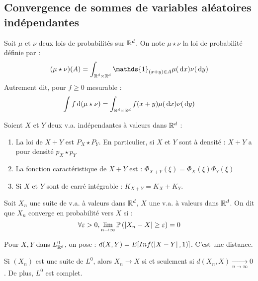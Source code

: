 \documentclass{cours}
\begin{document}
\subsection{Convergence de sommes de variables aléatoires indépendantes}

\begin{definition}
    Soit $\mu$ et $\nu$ deux lois de probabilités sur $\mathbb{R}^{d}$. On note $\mu \star \nu$ la loi de probabilité définie par :
    \[
        (\mu \star \nu)(A) = \int_{\R^{d} \times \R^{d}} \mathds{1}_{(x + y) \in A} \mu(\d x) \nu(\d y)
    \]
    Autrement dit, pour $f \geq 0$ mesurable :
    \[
        \int f {\rm \, d}(\mu \star \nu) = \int_{\mathbb{R}^{d} \times \mathbb{R}^{d}} f(x + y)\mu({\rm \, d} x) \nu({\rm \, d} y)
    \]
\end{definition}

\begin{proposition}
    Soient $X$ et $Y$ deux v.a. indépendantes à valeurs dans $\mathbb{R}^{d}$ :
    \begin{enumerate}
        \item La loi de $X + Y$ est $P_{X} \star P_{Y}$. En particulier, si $X$ et $Y$ sont à densité : $X + Y$ a pour densité $p_{X} \star p_{Y}$
        \item La fonction caractéristique de $X + Y$ est : $\Phi_{X + Y}(\xi) = \Phi_{X}(\xi)\Phi_{Y}(\xi)$
        \item Si $X$ et $Y$ sont de carré intégrable : $K_{X + Y} = K_{X} + K_{Y}$.
    \end{enumerate}
\end{proposition}

\begin{definition}
    Soit $X_n$ une suite de v.a. à valeurs dans $\mathbb{R}^{d}$, $X$ une v.a. à valeurs dans $\mathbb{R}^{d}$. On dit que $X_{n}$ converge en probabilité vers $X$ si :
    \[
        \forall \varepsilon > 0, \lim_{n \to \infty} \mathbb{P}\left(\left|X_{n} - X\right| \geq \varepsilon\right) = 0
    \]
\end{definition}

\begin{definition}
    Pour $X, Y$ dans $L_{\mathbb{R}^{d}}^{0}$, on pose : $d(X, Y) = E[Inf(\left|X - Y\right|, 1)]$. C'est une distance.
\end{definition}

\begin{proposition}
    Si $\left(X_{n}\right)$ est une suite de $L^{0}$, alors $X_{n} \rightarrow X$ si et seulement si $d(X_{n}, X) \xrightarrow[n \to \infty]{} 0$. De plus, $L^{0}$ est complet.
\end{proposition}
\end{document}
